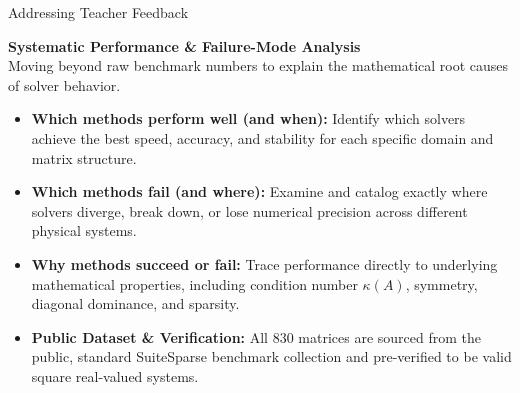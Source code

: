 \documentclass[aspectratio=169,10pt]{beamer}
\begin{document}
\begin{frame}{Addressing Teacher Feedback}
  \vspace{-0.15em}
  \colorbox{LSlightgold}{\parbox{0.98\linewidth}{\vspace{0.25em}
    {\bfseries\normalsize\color{LSnavy} Systematic Performance \& Failure-Mode Analysis}\\[0.15em]
    {\footnotesize\color{LSgray} Moving beyond raw benchmark numbers to explain the mathematical root causes of solver behavior.}
    \vspace{0.25em}}}
  \vspace{0.5em}

  \small
  \begin{itemize}\setlength\itemsep{0.6em}
    \item \textbf{\color{LSteal}Which methods perform well (and when):}
      Identify which solvers achieve the best speed, accuracy, and stability for each specific domain and matrix structure.

    \item \textbf{\color{LSteal}Which methods fail (and where):}
      Examine and catalog exactly where solvers diverge, break down, or lose numerical precision across different physical systems.

    \item \textbf{\color{LSteal}Why methods succeed or fail:}
      Trace performance directly to underlying mathematical properties, including condition number $\kappa(A)$, symmetry, diagonal dominance, and sparsity.

    \item \textbf{\color{LSteal}Public Dataset \& Verification:}
      All 830 matrices are sourced from the public, standard SuiteSparse benchmark collection and pre-verified to be valid square real-valued systems.
  \end{itemize}
\end{frame}
\end{document}
